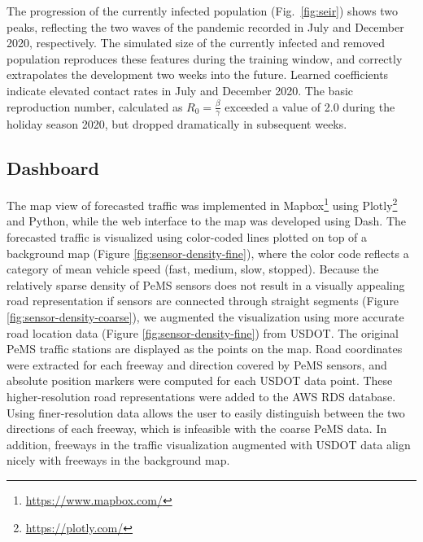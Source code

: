 \documentclass{article}
\begin{document}

The progression of the currently infected population (Fig.~\ref{fig:seir}) shows two peaks, reflecting the two waves of the pandemic recorded in July and December 2020, respectively.  
The simulated size of the currently infected and removed population reproduces these features during the training window, and correctly extrapolates the development two weeks into the future.  
Learned coefficients indicate elevated contact rates in July and December 2020.  The basic reproduction number, calculated as $R_0 = \frac{\beta}{\gamma}$ \cite{zou2020epidemic}
exceeded a value of 2.0 during the holiday season 2020, but dropped dramatically in subsequent weeks.

\subsection{Dashboard}

The map view of forecasted traffic was implemented in Mapbox\footnote{\url{https://www.mapbox.com/}} using Plotly\footnote{\url{https://plotly.com/}} and Python, while the web interface to the map was developed using Dash. The forecasted traffic is visualized using color-coded lines plotted on top of a background map (Figure \ref{fig:sensor-density-fine}), where the color code reflects a category of mean vehicle speed (fast, medium, slow, stopped). Because the relatively sparse density of PeMS sensors does not result in a visually appealing road representation if sensors are connected through straight segments (Figure \ref{fig:sensor-density-coarse}), we augmented the visualization using more accurate road location data (Figure \ref{fig:sensor-density-fine}) from USDOT. The original PeMS traffic stations are displayed as the points on the map. Road coordinates were extracted for each freeway and direction covered by PeMS sensors, and absolute position markers were computed for each USDOT data point. These higher-resolution road representations were added to the AWS RDS database. Using finer-resolution data allows the user to easily distinguish between the two directions of each freeway, which is infeasible with the coarse PeMS data. In addition, freeways in the traffic visualization augmented with USDOT data align nicely with freeways in the background map.
\end{document}
